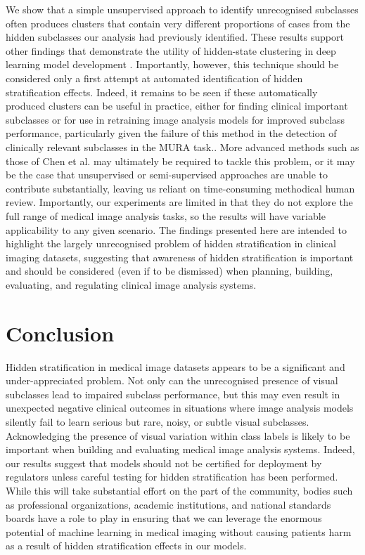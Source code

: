 \documentclass{article}
\begin{document}
We show that a simple unsupervised approach to identify unrecognised subclasses often produces clusters that contain very different proportions of cases from the hidden subclasses our analysis had previously identified. 
These results support other findings that demonstrate the utility of hidden-state clustering in deep learning model development \citep{Liu2019-qt}.
Importantly, however, this technique should be considered only a first attempt at automated identification of hidden stratification effects. 
Indeed, it remains to be seen if these automatically produced clusters can be useful in practice, either for finding clinical important subclasses or for use in retraining image analysis models for improved subclass performance, particularly given the failure of this method in the detection of clinically relevant subclasses in the MURA task.. 
More advanced methods such as those of Chen et al. \citep{chen2019slicing} may ultimately be required to tackle this problem, or it may be the case that unsupervised or semi-supervised approaches are unable to contribute substantially, leaving us reliant on time-consuming methodical human review.
Importantly, our experiments are limited in that they do not explore the full range of medical image analysis tasks, so the results will have variable applicability to any given scenario.
The findings presented here are intended to highlight the largely unrecognised problem of hidden stratification in clinical imaging datasets, suggesting that awareness of hidden stratification is important and should be considered (even if to be dismissed) when planning, building, evaluating, and regulating clinical image analysis systems.
 
\section{Conclusion}

Hidden stratification in medical image datasets appears to be a significant and under-appreciated problem. 
Not only can the unrecognised presence of visual subclasses lead to impaired subclass performance, but this may even result in unexpected negative clinical outcomes in situations where image analysis models silently fail to learn serious but rare, noisy, or subtle visual subclasses.
Acknowledging the presence of visual variation within class labels is likely to be important when building and evaluating medical image analysis systems.
Indeed, our results suggest that models should not be certified for deployment by regulators unless careful testing for hidden stratification has been performed.
While this will take substantial effort on the part of the community, bodies such as professional organizations, academic institutions, and national standards boards have a role to play in ensuring that we can leverage the enormous potential of machine learning in medical imaging without causing patients harm as a result of hidden stratification effects in our models.




\end{document}
